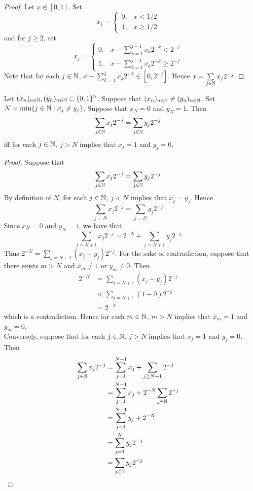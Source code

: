 \documentclass{book}
\begin{document}
	\begin{proof}
		Let $x \in [0,1]$. Set 
		$$x_1 = 
		\begin{cases}
			0, & x < 1/2 \\
			1, & x \geq 1/2 
		\end{cases}$$
		and for $j \geq 2$, set 
		$$x_j = \begin{cases}
			0, & x - \sum\limits_{k = 1}^{j-1}x_k2^{-k} < 2^{-j} \\
			1, & x - \sum\limits_{k = 1}^{j-1}x_k2^{-k} \geq 2^{-j} 
		\end{cases}$$
		Note that for each $j \in \mathbb{N}$, $x - \sum\limits_{k = 1}^{j}x_k2^{-k} \in [0, 2^{-j}]$. Hence $x = \sum\limits_{j \in \mathbb{N}} x_j2^{-j}$
	\end{proof}
	
	\begin{ex}  
		Let $(x_n)_{n \in \mathbb{N}}, (y_n)_{n \in \mathbb{N}} \subset \{0,1\}^{\mathbb{N}}$. Suppose that $(x_n)_{n \in \mathbb{N}} \neq (y_n)_{n \in \mathbb{N}}$. Set $N = \min\{j \in \mathbb{N}: x_j \neq y_j\}$. Suppose that $x_N = 0$ and $y_N = 1$. Then
		$$\sum\limits_{j \in \mathbb{N}} x_j 2^{-j} = \sum\limits_{j \in \mathbb{N}} y_j 2^{-j}$$ 
		iff for each $j \in \mathbb{N}$, $j > N$ implies that $x_j = 1$ and $y_j = 0$. 
	\end{ex}
	
	\begin{proof}
		Suppose that 
		$$\sum\limits_{j \in \mathbb{N}} x_j 2^{-j} = \sum\limits_{j \in \mathbb{N}} y_j 2^{-j}$$
		By definition of $N$, for each $j \in \mathbb{N}$, $j < N$ implies that $x_j = y_j$. Hence 
		$$\sum\limits_{j = N} x_j 2^{-j} = \sum\limits_{j = N} y_j 2^{-j}$$ 
		Since $x_N = 0$ and $y_N = 1$, we have that 
		$$\sum\limits_{j = N +1} x_j 2^{-j} = 2^{-N} + \sum\limits_{j = N+1} y_j 2^{-j}$$ 
		Thus $2^{-N} = \sum\limits_{j = N+1} (x_j - y_j) 2^{-j}$. For the sake of contradiction, suppose that there exists $m > N$ and $x_m \neq 1$ or $y_m \neq 0$. Then
		\begin{align*}
			2^{-N} 
			&= \sum\limits_{j = N+1} (x_j - y_j) 2^{-j} \\
			& < \sum\limits_{j = N+1} (1 - 0) 2^{-j} \\
			& = 2^{-N}
		\end{align*}
		which is a contradiction. Hence for each $m \in \mathbb{N}$, $m > N$ implies that $x_m = 1$ and $y_m = 0$. \vspace{.2cm}\\
		Conversely, suppose that for each $j \in \mathbb{N}$, $j > N$ implies that $x_j = 1$ and $y_j = 0$. Then 
		\begin{align*}
			\sum\limits_{j \in \mathbb{N}} x_j 2^{-j}
			& = \sum_{j=1}^{N-1} x_j + \sum_{j \geq N+1} 2^{-j} \\
			& = \sum_{j=1}^{N-1} x_j + 2^{-N} \sum_{j \in \mathbb{N}} 2^{-j} \\
			& = \sum_{j=1}^{N-1} y_j + 2^{-N} \\
			& = \sum_{j=1}^N y_j2^{-j} \\
			& = \sum\limits_{j \in \mathbb{N}} y_j 2^{-j}
		\end{align*}
	\end{proof}
	
\end{document}
